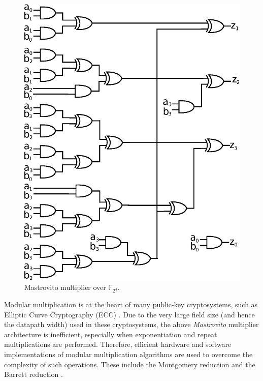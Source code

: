 \begin{figure}[b]
	\begin{center}
	\includegraphics[scale=0.50]{figures/mul4bit.eps}
	\end{center}
	\caption{Mastrovito multiplier over $\mathbb{F}_{2^4}$.}
	\label{fig:mas4}
\end{figure}

Modular multiplication is at the heart of many public-key cryptosystems, 
such as Elliptic Curve Cryptography (ECC) \cite{ecc:1986}. 
Due to the very large field size (and hence the datapath width) used in these cryptosystems, 
the above {\it Mastrovito} multiplier architecture is inefficient, especially when exponentiation and repeat multiplications are performed.
Therefore, efficient hardware and software implementations of modular multiplication algorithms are used to overcome the complexity of such operations. 
These include the Montgomery reduction \cite{PT:1985} \cite{acar:1998} and the Barrett reduction \cite{Knezevic:2008}.

